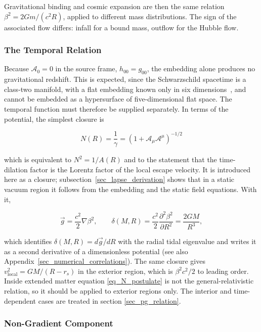 \documentclass[pdflatex,sn-mathphys-num]{sn-jnl}%
\theoremstyle{thmstyleone}%
\theoremstyle{thmstyletwo}%
\theoremstyle{thmstylethree}%
\begin{document}
Gravitational binding and cosmic expansion are then the same relation $\beta^2=2Gm/(c^2R)$, applied to different mass distributions. The sign of the associated flow differs: infall for a bound mass, outflow for the Hubble flow.

\subsubsection{The Temporal Relation}

Because $\mathcal{A}_0=0$ in the source frame, $h_{00}=g_{00}$, the embedding alone produces no gravitational redshift. This is expected, since the Schwarzschild spacetime is a class-two manifold, with a flat embedding known only in six dimensions~\cite{Kasner1921}, and cannot be embedded as a hypersurface of five-dimensional flat space. The temporal function must therefore be supplied separately. In terms of the potential, the simplest closure is

\begin{equation}\label{eq_N_postulate}
    \boxed{
    N(R)=\frac{1}{\gamma}=\left(1+\mathcal{A}_\mu\mathcal{A}^\mu\right)^{-1/2}
    }
\end{equation}

which is equivalent to $N^2=1/A(R)$ and to the statement that the time-dilation factor is the Lorentz factor of the local escape velocity. It is introduced here as a closure; subsection~\ref{sec_lapse_derivation} shows that in a static vacuum region it follows from the embedding and the static field equations. With it,

\begin{equation}
    \vec{g}=\frac{c^2}{2}\nabla\beta^2,
    \qquad
    \delta(M,R)=\frac{c^2}{2}\frac{\partial^2\beta^2}{\partial R^2}=\frac{2GM}{R^3},
\end{equation}

which identifies $\delta(M,R)=d\vec{g}/dR$ with the radial tidal eigenvalue and writes it as a second derivative of a dimensionless potential (see also Appendix~\ref{sec_numerical_correlations}). The same closure gives $v_{\mathrm{local}}^2=GM/(R-r_s)$ in the exterior region, which is $\beta^2c^2/2$ to leading order. Inside extended matter equation \ref{eq_N_postulate} is not the general-relativistic relation, so it should be applied to exterior regions only. The interior and time-dependent cases are treated in section \ref{sec_pg_relation}.

\subsubsection{Non-Gradient Component}
\end{document}
